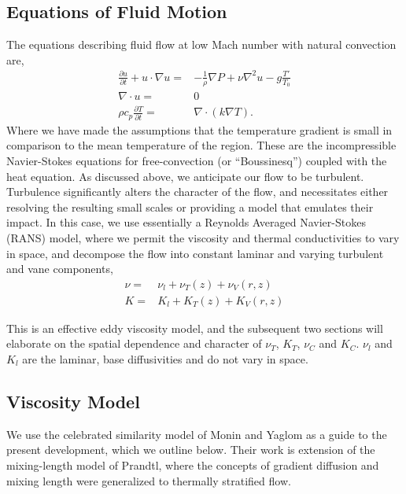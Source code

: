 \subsection{Equations of Fluid Motion}
%
%

The equations describing fluid flow at
low Mach number with natural convection are, %
\begin{eqnarray*}
 \frac{\partial u}{\partial t} + u \cdot \nabla u =&
  -\frac{1}{\rho}\nabla P + \nu \nabla^2 u - g \frac{T'}{T_0}\\
 \nabla \cdot u =& 0 \\
 \rho c_p \frac{\partial T}{\partial t} =& \nabla \cdot ( k \nabla T).
\end{eqnarray*} 
Where we have made the assumptions that the temperature gradient is small in
comparison to the mean temperature of the region. These are the
incompressible Navier-Stokes equations for free-convection (or
``Boussinesq'') coupled with the heat equation. 
%
%
%
As discussed above, we anticipate our flow to be
turbulent. Turbulence significantly alters the character of the flow,
and necessitates either resolving the resulting small scales or
providing a model that emulates their impact. In this case, we use
essentially a Reynolds Averaged Navier-Stokes (RANS) model, where we
permit the viscosity and thermal conductivities to vary in space, and
decompose the flow into constant laminar and varying turbulent and vane
components,  
\begin{eqnarray*}
 \nu =& \nu_{l} + \nu_{T}(z) + \nu_{V}(r,z) \\
 K =& K_{l} + K_{T}(z) + K_{V}(r,z)
\end{eqnarray*}

This is an effective eddy viscosity model, and the subsequent two
sections will elaborate on the spatial dependence and character of
$\nu_T$, $K_T$, $\nu_C$ and $K_C$. $\nu_l$ and $K_l$ are the laminar,
base diffusivities and do not vary in space. 

\subsection{Viscosity Model}

We use the celebrated similarity model of Monin and
Yaglom\cite{monin2007statistical,monin1954basic} as a guide to the
present development, which we outline below. Their work is extension of
the mixing-length model of Prandtl, where the concepts of gradient
diffusion and mixing length were generalized to thermally stratified
flow.   

